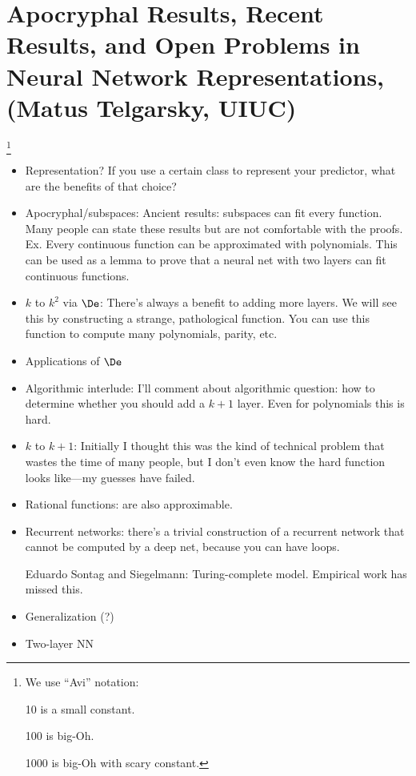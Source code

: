 \section{Apocryphal Results, Recent Results, and Open Problems in Neural Network Representations, (Matus Telgarsky, UIUC)}
\footnote{We use ``Avi'' notation: 

10 is a small constant.

100 is big-Oh.

1000 is big-Oh with scary constant.
}

\begin{itemize}
\item
Representation? If you use a certain class to represent your predictor, what are the benefits of that choice?
\item
Apocryphal/subspaces: Ancient results: subspaces can fit every function. Many people can state these results but are not comfortable with the proofs. Ex. Every continuous function can be approximated with polynomials. This can be used as a lemma to prove that a neural net with two layers can fit continuous functions.
\item
$k$ to $k^2$ via $\De$: There's always a benefit to adding more layers. We will see this by constructing a strange, pathological function. You can use this function to compute many polynomials, parity, etc.
\item
Applications of $\De$
\item
Algorithmic interlude: I'll comment about algorithmic question: how to determine whether you should add a $k+1$ layer. Even for polynomials this is hard.
\item
$k$ to $k+1$: Initially I thought this was the kind of technical problem that wastes the time of many people, but I don't even know the hard function looks like---my guesses have failed.
\item
Rational functions: are also approximable.
\item
Recurrent networks: there's a trivial construction of a recurrent network that cannot be computed by a deep net, because you can have loops.

Eduardo Sontag and Siegelmann: Turing-complete model. Empirical work has missed this. 
\item
Generalization (?)
\item Two-layer NN
\end{itemize}

